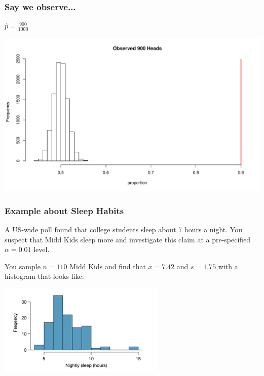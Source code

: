 \documentclass[handout]{beamer}
\newcommand{\xbar}{\overline{x}}
\begin{document}
\begin{frame}
\frametitle{Say we observe...}
$\widehat{p} = \frac{900}{1000}$
\begin{center}
\includegraphics[width=\textwidth]{figure/hist4}
\end{center}
\end{frame}


\begin{frame}
\frametitle{Example about Sleep Habits}
A US-wide poll found that college students sleep about 7 hours a night. You suspect that Midd Kids sleep more and investigate this claim at a pre-specified $\alpha=0.01$ level.  

\vspace{0.5cm}

\pause You sample $n=110$ Midd Kids and find that $\xbar = 7.42$ and $s=1.75$ with a histogram that looks like:

\begin{center}
\includegraphics[width=0.6\textwidth]{figure/sleep.png}
\end{center}

\end{frame}
\end{document}
